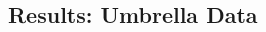 \documentclass[a0,landscape]{a0poster}
\begin{document}
\begin{multicols}{4}

\subsection*{Results: Umbrella Data \cite{Scharstein14}}
\label{sec:UmbrellaExperiment}


\end{multicols}
\end{document}
